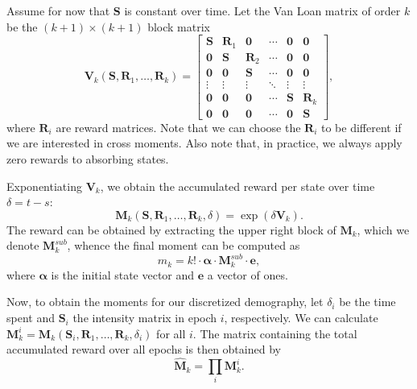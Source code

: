 \documentclass[hidelinks,11pt]{article}
\begin{document}
    Assume for now that $\mathbf{S}$ is constant over time.
    Let the Van Loan matrix of order $k$ be the $(k+1) \times (k+1)$ block matrix
    \begin{equation*}
        \mathbf{V}_{k}(\mathbf{S}, \mathbf{R}_1, \dots, \mathbf{R}_k) =
        \begin{bmatrix}
            \mathbf{S} & \mathbf{R}_1 & \mathbf{0}            & \cdots & \mathbf{0}          & \mathbf{0}            \\
            \mathbf{0}          & \mathbf{S}   & \mathbf{R}_2 & \cdots & \mathbf{0}          & \mathbf{0}            \\
            \mathbf{0}          & \mathbf{0}            & \mathbf{S}   & \cdots & \mathbf{0}          & \mathbf{0}            \\
            \vdots     & \vdots       & \vdots       & \ddots & \vdots     & \vdots       \\
            \mathbf{0}          & \mathbf{0}            & \mathbf{0}            & \cdots & \mathbf{S} & \mathbf{R}_k \\
            \mathbf{0}          & \mathbf{0}            & \mathbf{0}            & \cdots & \mathbf{0}          & \mathbf{S}
        \end{bmatrix},
    \end{equation*} %
    where $\mathbf{R}_i$ are reward matrices.
    Note that we can choose the $\mathbf{R}_i$ to be different if we are interested in cross moments.
    Also note that, in practice, we always apply zero rewards to absorbing states.

    Exponentiating $\mathbf{V}_k$, we obtain the accumulated reward per state over time $\delta = t - s$:
    \begin{equation*}
        \mathbf{M}_k(\mathbf{S}, \mathbf{R}_1, \dots, \mathbf{R}_k,\delta) = \exp(\delta\mathbf{V}_k).
    \end{equation*}
    The reward can be obtained by extracting the upper right block of $\mathbf{M}_k$, which we denote $\mathbf{M}_k^{sub}$, whence the final moment can be computed as
    \begin{equation*}
        m_k = k! \cdot \bm{\alpha} \cdot \mathbf{M}_k^{sub} \cdot \mathbf{e},
    \end{equation*}
    where $\bm{\alpha}$ is the initial state vector and $\mathbf{e}$ a vector of ones.

    Now, to obtain the moments for our discretized demography, let $\delta_i$ be the time spent and $\mathbf{S}_i$ the intensity matrix in epoch $i$, respectively.
    We can calculate $\mathbf{M}_k^i = \mathbf{M}_k(\mathbf{S}_i, \mathbf{R}_1, \dots, \mathbf{R}_k,\delta_i)$ for all $i$.
    The matrix containing the total accumulated reward over all epochs is then obtained by
    \begin{equation}
        \label{eq:prod_moments}
        \hat{\mathbf{M}}_k = \prod_i{\mathbf{M}_k^i}.
    \end{equation}
\end{document}
